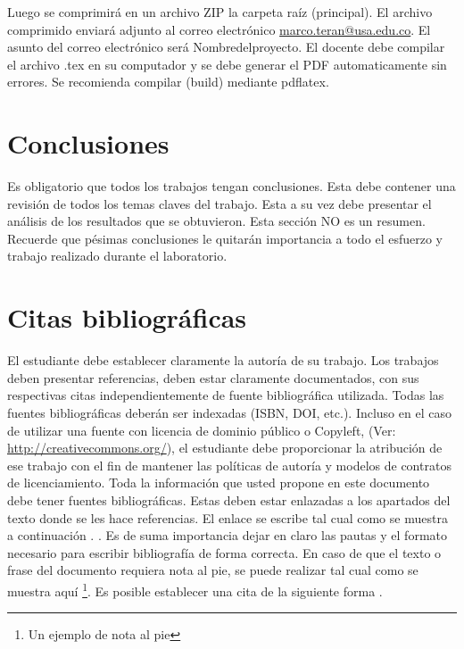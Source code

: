 \documentclass[
10pt,			%
letterpaper,	%
oneside,		%
headinclude, footinclude, %
BCOR5mm, 		%
]{scrartcl}
\begin{document}
Luego se comprimirá en un archivo ZIP la carpeta raíz (principal). El archivo comprimido enviará adjunto al correo electrónico \url{marco.teran@usa.edu.co}. El asunto del correo electrónico será Nombredelproyecto. El docente debe compilar el archivo .tex en su computador y se debe generar el PDF automaticamente sin errores.
Se recomienda compilar (build) mediante pdflatex.


\section{Conclusiones}

Es obligatorio que todos los trabajos tengan conclusiones.
Esta debe contener una revisión de todos los temas claves del trabajo.
Esta a su vez debe presentar el análisis de los resultados que se obtuvieron. Esta sección NO es un resumen.\\
Recuerde que pésimas conclusiones le quitarán importancia a todo el esfuerzo y trabajo realizado durante el laboratorio.


\section{Citas bibliográficas}

El estudiante debe establecer claramente la autoría de su trabajo. 
Los trabajos deben presentar referencias, deben estar claramente documentados, con sus respectivas citas independientemente de fuente bibliográfica utilizada. Todas las fuentes bibliográficas deberán ser indexadas (ISBN, DOI, etc.).
Incluso en el caso de utilizar una fuente con licencia de dominio público o Copyleft, (Ver: \url{http://creativecommons.org/}), el estudiante debe proporcionar la atribución de ese trabajo con el fin de mantener las políticas de autoría y modelos de contratos de licenciamiento. Toda la información que usted propone en este documento debe tener fuentes bibliográficas. Estas deben estar enlazadas a los apartados del texto donde se les hace referencias. El enlace se escribe tal cual como se muestra a continuación \cite{Tufte2006}.
. Es de suma importancia dejar en claro las pautas y el formato necesario para escribir bibliografía de forma correcta. En caso de que el texto o frase del documento requiera nota al pie, se puede realizar tal cual como se muestra aquí \footnote{Un ejemplo de nota al pie}. Es posible establecer una cita de la siguiente forma \cite{Tufte2006,Tufte1990}.\\

\nocite{*}


\end{document}
